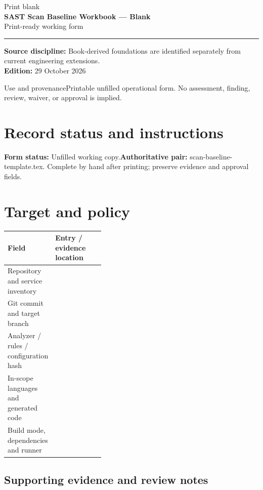 \documentclass[10pt,letterpaper]{article}
\newcommand{\writearea}[1]{\par\begin{tcolorbox}[colback=white,colframe=linegray,boxrule=0.5pt,height=#1,sharp corners]\mbox{}\end{tcolorbox}\par}
\begin{document}
\hypersetup{pageanchor=false}%
\begin{titlepage}
\vspace*{1.0in}
{\color{bluegray}\Large Print blank}\\[1.0em]
{\color{navy}\Huge\bfseries SAST Scan Baseline Workbook --- Blank}\\[0.7em]
{\Large Print-ready working form}\\[2.0em]
\rule{\linewidth}{1.0pt}
\vfill
\textbf{Source discipline:} Book-derived foundations are identified separately from current engineering extensions.\\
\textbf{Edition:} 29 October 2026
\end{titlepage}\hypersetup{pageanchor=true}
\tableofcontents
\clearpage
\begin{focusbox}{Use and provenance}Printable unfilled operational form. No assessment, finding, review, waiver, or approval is implied.\end{focusbox}
\section{Record status and instructions}
\textbf{Form status:} Unfilled working copy.\quad\textbf{Authoritative pair:} scan-baseline-template.tex. Complete by hand after printing; preserve evidence and approval fields.

\section{Target and policy}
\begin{tabularx}{\linewidth}{@{}p{0.38\linewidth}Y@{}}
\toprule Field & Entry / evidence location\\\midrule
Repository and service inventory & \\[1.0em]
\midrule
Git commit and target branch & \\[1.0em]
\midrule
Analyzer / rules / configuration hash & \\[1.0em]
\midrule
In-scope languages and generated code & \\[1.0em]
\midrule
Build mode, dependencies and runner & \\[1.0em]
\midrule
\end{tabularx}
\subsection{Supporting evidence and review notes}
\writearea{1.45in}
\clearpage
\end{document}
